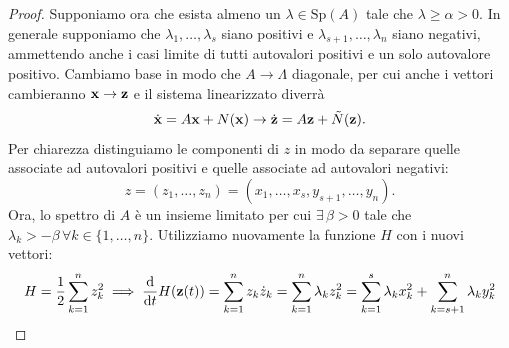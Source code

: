 \begin{proof}
        Supponiamo ora che esista almeno un $\lambda \in \mathrm{Sp}(A)$ tale che $\lambda\geq\alpha>0$. In generale supponiamo che $\lambda_1,\dots, \lambda_s$ siano positivi e $\lambda_{s+1},\dots,\lambda_n$ siano negativi, ammettendo anche i casi limite di tutti autovalori positivi e un solo autovalore positivo. Cambiamo base in modo che $A\to \Lambda$ diagonale, per cui anche i vettori cambieranno $\mathbf{x} \to \mathbf{z}$ e il sistema linearizzato diverrà
        \begin{equation}
            \dot{\mathbf{x}} = A\mathbf{x} + N(\mathbf{x}) \to \dot{\mathbf{z}} = A\mathbf{z} + \tilde{N}(\mathbf{z}). 
        \end{equation}
        Per chiarezza distinguiamo le componenti di $z$ in modo da separare quelle associate ad autovalori positivi e quelle associate ad autovalori negativi:
        \begin{equation}
            z= (z_1,\dots,z_n) = (x_1,\dots,x_{s},y_{s+1},\dots,y_n).
        \end{equation}
        Ora, lo spettro di $A$ è un insieme limitato per cui $\exists\,\beta >0$ tale che $\lambda_k > -\beta \,\forall k\in\{1,\dots,n\}$. Utilizziamo nuovamente la funzione $H$ con i nuovi vettori:
        \begin{equation}
            H = \frac{1}{2}\sum_{k=1}^n z_k^2 \implies \frac{\mathrm{d}}{\mathrm{d}t} H(\mathbf{z}(t)) = \sum_{k=1}^n z_k \dot{z}_k = \sum_{k=1}^n \lambda_k z_k^2 = \sum_{k=1}^s \lambda_k x_k^2 +\sum_{k=s+1}^n\lambda_k y_k^2
        \end{equation}
    

\end{proof}
